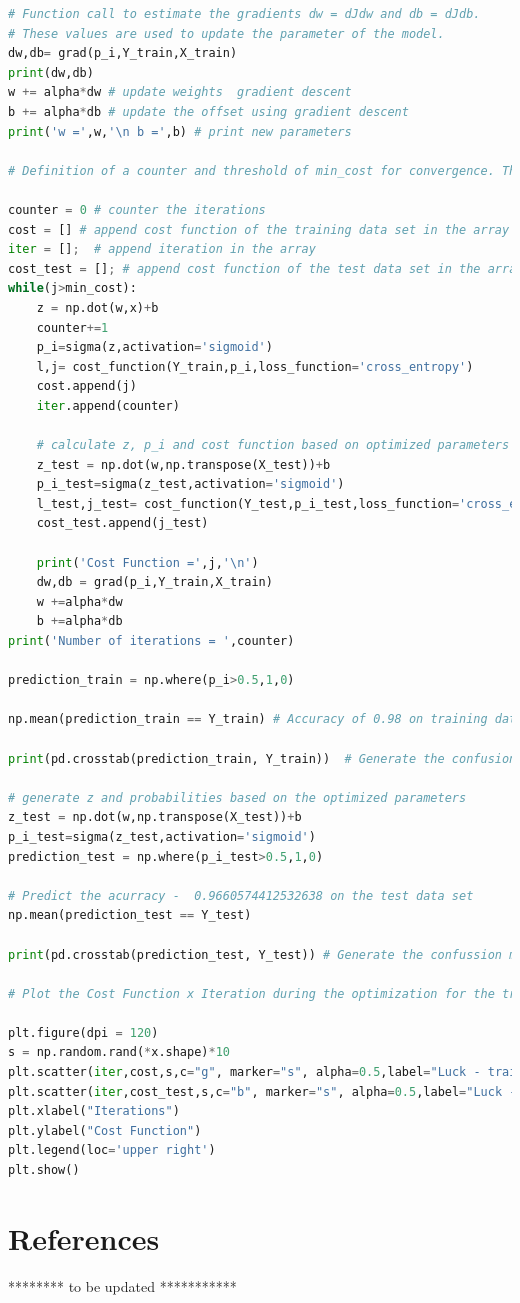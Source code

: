 \documentclass{article}
\begin{document}
\begin{lstlisting}[language=Python]
# Function call to estimate the gradients dw = dJdw and db = dJdb. 
# These values are used to update the parameter of the model.
dw,db= grad(p_i,Y_train,X_train) 
print(dw,db)
w += alpha*dw # update weights  gradient descent
b += alpha*db # update the offset using gradient descent
print('w =',w,'\n b =',b) # print new parameters

# Definition of a counter and threshold of min_cost for convergence. This means that the parameters of the model are optimized. All the previous operations are performed inside the loop until the break of the self-consistent while.

counter = 0 # counter the iterations
cost = [] # append cost function of the training data set in the array
iter = [];  # append iteration in the array
cost_test = []; # append cost function of the test data set in the array
while(j>min_cost):
    z = np.dot(w,x)+b
    counter+=1
    p_i=sigma(z,activation='sigmoid')
    l,j= cost_function(Y_train,p_i,loss_function='cross_entropy')
    cost.append(j)
    iter.append(counter)
    
    # calculate z, p_i and cost function based on optimized parameters for the test data set.
    z_test = np.dot(w,np.transpose(X_test))+b 
    p_i_test=sigma(z_test,activation='sigmoid')
    l_test,j_test= cost_function(Y_test,p_i_test,loss_function='cross_entropy')
    cost_test.append(j_test)
    
    print('Cost Function =',j,'\n')
    dw,db = grad(p_i,Y_train,X_train)
    w +=alpha*dw
    b +=alpha*db
print('Number of iterations = ',counter)

prediction_train = np.where(p_i>0.5,1,0)

np.mean(prediction_train == Y_train) # Accuracy of 0.98 on training data set

print(pd.crosstab(prediction_train, Y_train))  # Generate the confusion matrix

# generate z and probabilities based on the optimized parameters
z_test = np.dot(w,np.transpose(X_test))+b 
p_i_test=sigma(z_test,activation='sigmoid')
prediction_test = np.where(p_i_test>0.5,1,0)

# Predict the acurracy -  0.9660574412532638 on the test data set
np.mean(prediction_test == Y_test) 

print(pd.crosstab(prediction_test, Y_test)) # Generate the confussion matrix for further analysis

# Plot the Cost Function x Iteration during the optimization for the training and test data set

plt.figure(dpi = 120)
s = np.random.rand(*x.shape)*10
plt.scatter(iter,cost,s,c="g", marker="s", alpha=0.5,label="Luck - train")
plt.scatter(iter,cost_test,s,c="b", marker="s", alpha=0.5,label="Luck - test")
plt.xlabel("Iterations")
plt.ylabel("Cost Function")
plt.legend(loc='upper right')
plt.show()

\end{lstlisting}

\section{References}
******** to be updated ***********
\end{document}
